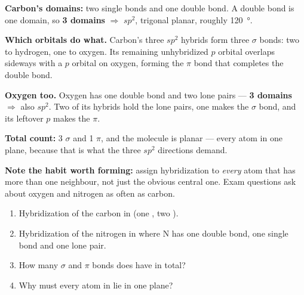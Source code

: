 \documentclass{apchem-worksheet}
\begin{document}
\begin{workedexample}[I do: formaldehyde, \ce{H2CO}]
\textbf{Carbon's domains:} two  single bonds and one 
double bond. A double bond is one domain, so \textbf{3 domains}
$\Rightarrow$ \textbf{$sp^{2}$}, trigonal planar, roughly
\SI{120}{\degree}.

\textbf{Which orbitals do what.} Carbon's three $sp^{2}$ hybrids form
three $\sigma$ bonds: two to hydrogen, one to oxygen. Its remaining
unhybridized $p$ orbital overlaps sideways with a $p$ orbital on oxygen,
forming the $\pi$ bond that completes the double bond.

\textbf{Oxygen too.} Oxygen has one double bond and two lone pairs ---
\textbf{3 domains} $\Rightarrow$ also \textbf{$sp^{2}$}. Two of its
hybrids hold the lone pairs, one makes the $\sigma$ bond, and its
leftover $p$ makes the $\pi$.

\textbf{Total count:} 3 $\sigma$ and 1 $\pi$, and the molecule is
planar --- every atom in one plane, because that is what the three
$sp^{2}$ directions demand.

\textbf{Note the habit worth forming:} assign hybridization to
\emph{every} atom that has more than one neighbour, not just the obvious
central one. Exam questions ask about oxygen and nitrogen as often as
carbon.
\end{workedexample}

\begin{yourturn}
\begin{enumerate}[leftmargin=*,itemsep=0.5em]
  \item Hybridization of the carbon in  (one , two
        ). \workspace[1.4cm]
  \item Hybridization of the nitrogen in  where N has one
        double bond, one single bond and one lone pair.
        \workspace[1.6cm]
  \item How many $\sigma$ and $\pi$ bonds does  have in total?
        \workspace[1.4cm]
  \item Why must every atom in  lie in one plane?
        \workspace[1.6cm]
\end{enumerate}
\end{yourturn}
\end{document}
